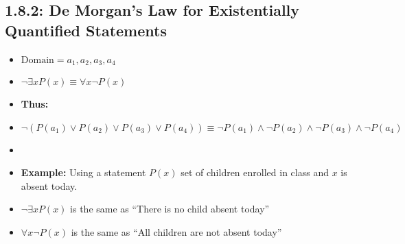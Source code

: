 \documentclass{article}
\begin{document}
\subsection*{1.8.2: De Morgan's Law for Existentially Quantified Statements}
\begin{itemize}
    \item[] $\text{Domain} = {a_1, a_2, a_3, a_4}$
    \item[] $\neg \exists x P(x) \equiv \forall x \neg P(x)$
    \item[] \textbf{Thus:}
    \item[] $\neg(P(a_1) \lor P(a_2) \lor P(a_3) \lor P(a_4)) \equiv \neg P(a_1) \land \neg P(a_2) \land \neg P(a_3) \land \neg P(a_4)$
    \item[] 
    \item[] \textbf{Example:} Using a statement $P(x)$ set of children enrolled in class and $x$ is absent today.
    \item[] $\neg \exists x P(x)$ is the same as ``There is no child absent today''
    \item[] $\forall x \neg P(x)$ is the same as ``All children are not absent today''
\end{itemize}
\end{document}
